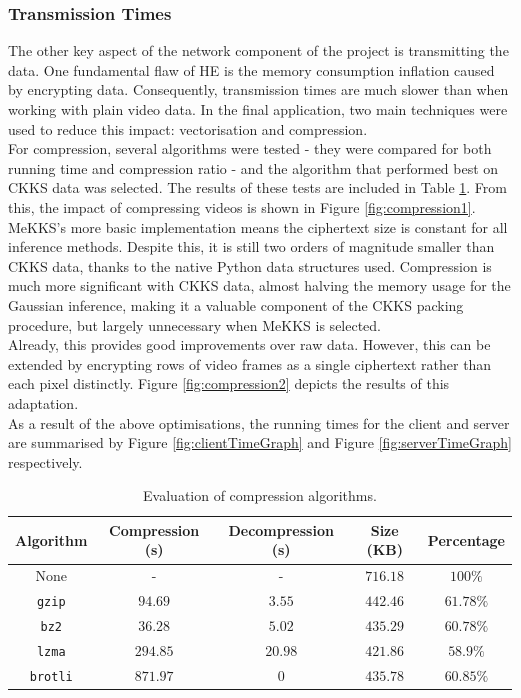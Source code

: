 \setlength{\leftskip}{0cm}
\subsubsection{Transmission Times}
\setlength{\leftskip}{0.5cm}
\indent \indent
The other key aspect of the network component of the project is transmitting the data. One fundamental flaw of HE is the memory consumption inflation caused by encrypting data. Consequently, transmission times are much slower than when working with plain video data. In the final application, two main techniques were used to reduce this impact: vectorisation and compression.
\smallskip \\ \indent
For compression, several algorithms were tested - they were compared for both running time and compression ratio - and the algorithm that performed best on CKKS data was selected. The results of these tests are included in Table \ref{tab:compression}. From this, the impact of compressing videos is shown in Figure \ref{fig:compression1}. MeKKS's more basic implementation means the ciphertext size is constant for all inference methods. Despite this, it is still two orders of magnitude smaller than CKKS data, thanks to the native Python data structures used. Compression is much more significant with CKKS data, almost halving the memory usage for the Gaussian inference, making it a valuable component of the CKKS packing procedure, but largely unnecessary when MeKKS is selected.
\smallskip \\ \indent
Already, this provides good improvements over raw data. However, this can be extended by encrypting rows of video frames as a single ciphertext rather than each pixel distinctly. Figure \ref{fig:compression2} depicts the results of this adaptation.
\smallskip \\ \indent
As a result of the above optimisations, the running times for the client and server are summarised by Figure \ref{fig:clientTimeGraph} and Figure \ref{fig:serverTimeGraph} respectively.
\begin{table}
    \centering
    \def\arraystretch{1.25}
    \begin{tabular}{|c||c|c|c|c|}
        \hline
        \textrm{\textbf{Algorithm}} & \textrm{\textbf{Compression} (s)} & \textrm{\textbf{Decompression} (s)} & \textrm{\textbf{Size} (KB)} & \textrm{\textbf{Percentage}}
        \\ \hline \hline
        \textrm{None} & - & - & $716.18$ & $100\%$
        \\ \hline
        \texttt{gzip} & $94.69$ & $3.55$ & $442.46$ & $61.78\%$
        \\ \hline
        \texttt{bz2} & $36.28$ & $5.02$ & $435.29$ & $60.78\%$
        \\ \hline
        \texttt{lzma} & $294.85$ & $20.98$ & $421.86$ & $58.9\%$
        \\ \hline
        \texttt{brotli} & $871.97$ & $0$ & $435.78$  & $60.85\%$
        \\ \hline
    \end{tabular}
    \caption[Compression algorithms]{Evaluation of compression algorithms.}
    \label{tab:compression}
\end{table}
